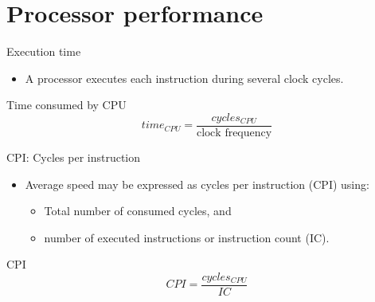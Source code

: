 \section{Processor performance}

\begin{frame}[t]{Execution time}
\begin{itemize}
  \item A processor executes each instruction during several clock cycles.
\end{itemize}
\begin{block}{Time consumed by CPU}
\begin{displaymath}
time_{CPU} = 
\frac{cycles_{CPU}}{\text{clock frequency}}
\end{displaymath}
\end{block}
\end{frame}

\begin{frame}[t]{CPI: Cycles per instruction}
  \begin{itemize}
    \item Average speed may be expressed as cycles per instruction (CPI) using:
      \begin{itemize}
         \item Total number of consumed cycles, and
         \item number of executed instructions or instruction count (IC).
      \end{itemize}
  \end{itemize}
\begin{block}{CPI}
\begin{displaymath}
CPI =
\frac{cycles_{CPU}}{IC}
\end{displaymath}
\end{block}
\end{frame}

